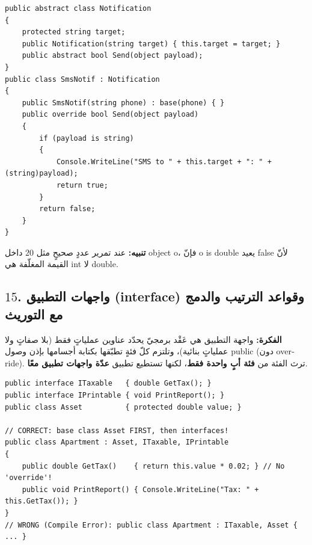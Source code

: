 \documentclass[14pt]{extarticle}
\begin{document}
\begin{boxCode}
\begin{english}
\begin{verbatim}
public abstract class Notification
{
    protected string target;
    public Notification(string target) { this.target = target; }
    public abstract bool Send(object payload);
}
public class SmsNotif : Notification
{
    public SmsNotif(string phone) : base(phone) { }
    public override bool Send(object payload)
    {
        if (payload is string)
        {
            Console.WriteLine("SMS to " + this.target + ": " + (string)payload);
            return true;
        }
        return false;
    }
}
\end{verbatim}
\end{english}
\end{boxCode}

\textbf{تنبيه:} عند تمرير عددٍ صحيحٍ مثل $20$ داخل \textenglish{object o}، فإنّ \textenglish{o is double} يعيد \textenglish{false} لأنّ القيمة المغلّفة هي \textenglish{int} لا \textenglish{double}.

\filbreak
\subsection*{$15$. واجهات التطبيق (\textenglish{interface}) وقواعد الترتيب والدمج مع التوريث}
\textbf{الفكرة:} واجهة التطبيق هي عَقْد برمجيّ يحدّد عناوين عملياتٍ فقط (بلا صفاتٍ ولا عملياتٍ بنائية)، وتلتزم كلّ فئةٍ تطبّقها بكتابة أجسامها بإذن وصول \textenglish{public} (دون \textenglish{override}). ترث الفئة من \textbf{فئة أبٍ واحدة فقط}، لكنها تستطيع تطبيق \textbf{عدّة واجهات تطبيق معًا}.

\begin{boxCode}
\begin{english}
\begin{verbatim}
public interface ITaxable   { double GetTax(); }
public interface IPrintable { void PrintReport(); }
public class Asset          { protected double value; }

// CORRECT: base class Asset FIRST, then interfaces!
public class Apartment : Asset, ITaxable, IPrintable
{
    public double GetTax()    { return this.value * 0.02; } // No 'override'!
    public void PrintReport() { Console.WriteLine("Tax: " + this.GetTax()); }
}
// WRONG (Compile Error): public class Apartment : ITaxable, Asset { ... }
\end{verbatim}
\end{english}
\end{boxCode}
\end{document}
